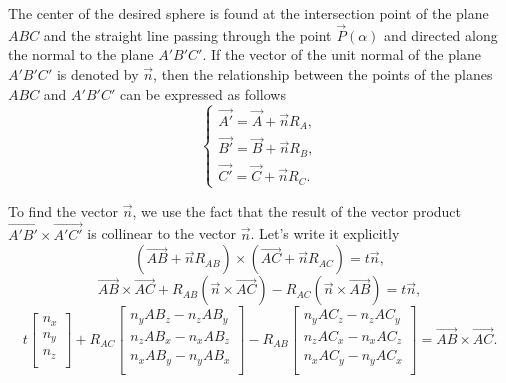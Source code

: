 \documentclass[
11pt,%
tightenlines,%
twoside,%
onecolumn,%
nofloats,%
nobibnotes,%
nofootinbib,%
superscriptaddress,%
noshowpacs,%
centertags]%
{revtex4-2}
\begin{document}
The center of the desired sphere is found at the intersection  point
of the plane $ABC$ and the straight line passing through the point
$\vec{P}(\alpha)$ and directed along the normal to the plane
$A'B'C'$.
If the vector of the unit normal of the plane $A'B'C'$ is  denoted
by $\vec{n}$, then the relationship between the points of the planes
$ABC$ and $A'B'C'$ can be expressed as follows
\begin{equation}
\begin{cases}
\vec{A'} = \vec{A} + \vec{n} R_A, \\
\vec{B'} = \vec{B} + \vec{n} R_B, \\
\vec{C'} = \vec{C} + \vec{n} R_C.
\end{cases}
\end{equation}

To find the vector $\vec{n}$, we use the fact that  the result of
the vector product $\vec{A'B'} \times \vec{A'C'}$ is collinear to
the vector $\vec{n}$.
Let's write it explicitly
\begin{equation}
(\vec{AB} + \vec{n} R_{AB}) \times (\vec{AC} + \vec{n} R_{AC}) = t
\vec{n},
\end{equation}
\begin{equation}
\vec{AB} \times \vec{AC} + R_{AB} (\vec{n} \times \vec{AC}) - R_{AC}
(\vec{n} \times \vec{AB}) = t \vec{n},
\end{equation}
\begin{equation}
t
\left[ { \begin{array}{c}
            n_x \\
            n_y \\
            n_z \\
         \end{array} } \right]
+ R_{AC}
\left[ { \begin{array}{c}
            n_y AB_z - n_z AB_y  \\
            n_z AB_x - n_x AB_z \\
            n_x AB_y - n_y AB_x \\
         \end{array} } \right]
- R_{AB}
\left[ { \begin{array}{c}
            n_y AC_z - n_z AC_y \\
            n_z AC_x - n_x AC_z \\
            n_x AC_y - n_y AC_x \\
         \end{array} } \right]
= \vec{AB} \times \vec{AC}.
\end{equation}
\end{document}
